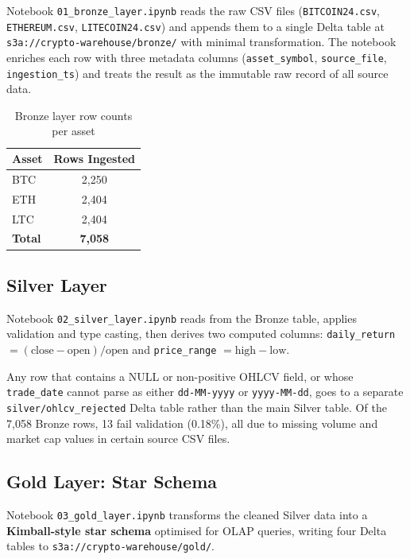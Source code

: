 \documentclass[a4paper]{article}
\begin{document}
Notebook \texttt{01\_bronze\_layer.ipynb} reads the raw CSV files
(\texttt{BITCOIN24.csv}, \texttt{ETHEREUM.csv}, \texttt{LITECOIN24.csv}) and
appends them to a single Delta table at
\texttt{s3a://crypto-warehouse/bronze/} with minimal transformation. The
notebook enriches each row with three metadata columns (\texttt{asset\_symbol},
\texttt{source\_file}, \texttt{ingestion\_ts}) and treats the result as the
immutable raw record of all source data.

\begin{table}[H]
\centering
\begin{tabular}{|l|c|}
\hline
\textbf{Asset} & \textbf{Rows Ingested} \\
\hline
BTC & 2,250 \\
\hline
ETH & 2,404 \\
\hline
LTC & 2,404 \\
\hline
\textbf{Total} & \textbf{7,058} \\
\hline
\end{tabular}
\caption{Bronze layer row counts per asset}
\end{table}

\subsection{Silver Layer}

Notebook \texttt{02\_silver\_layer.ipynb} reads from the Bronze table, applies
validation and type casting, then derives two computed columns:
\texttt{daily\_return} $= (\text{close} - \text{open}) / \text{open}$ and
\texttt{price\_range} $= \text{high} - \text{low}$.

Any row that contains a NULL or non-positive OHLCV field, or whose
\texttt{trade\_date} cannot parse as either \texttt{dd-MM-yyyy} or
\texttt{yyyy-MM-dd}, goes to a separate \texttt{silver/ohlcv\_rejected} Delta
table rather than the main Silver table. Of the 7,058 Bronze rows, 13 fail
validation (0.18\%), all due to missing volume and market cap values in certain
source CSV files.

\subsection{Gold Layer: Star Schema}

Notebook \texttt{03\_gold\_layer.ipynb} transforms the cleaned Silver data into
a \textbf{Kimball-style star schema} optimised for OLAP queries, writing four
Delta tables to \texttt{s3a://crypto-warehouse/gold/}.
\end{document}
